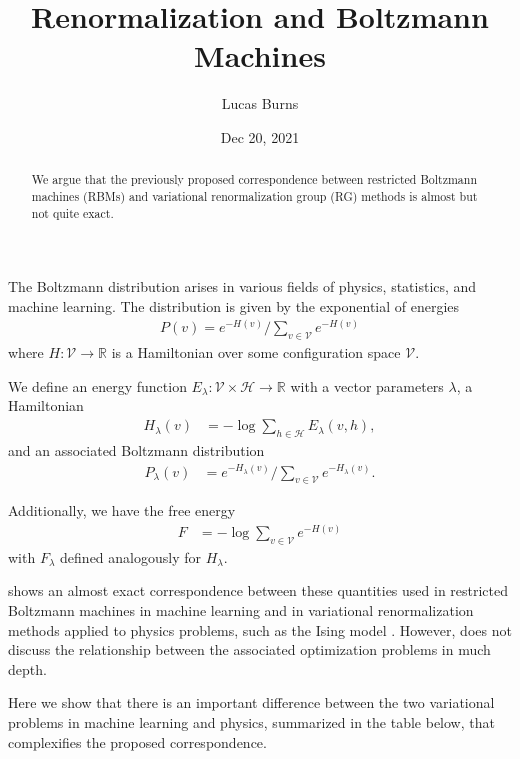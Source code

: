 \documentclass{article}
\title{Renormalization and Boltzmann Machines}
\author{Lucas Burns}
\date{Dec 20, 2021}
\theoremstyle{remark}
\theoremstyle{definition}
\begin{document}
\maketitle

\begin{abstract}
    We argue that the previously proposed correspondence between restricted Boltzmann machines (RBMs) and variational renormalization group (RG) methods \cite{mehta_exact_2014} is almost but not quite exact.
\end{abstract}

The Boltzmann distribution arises in various fields of physics, statistics, and machine learning. The distribution is given by the exponential of energies
\begin{align}
    P(v) = e^{-H(v)}/\sum_{v \in \mathcal V} e^{-H(v)}
\end{align}
where $H : \mathcal V \to \mathbb R$ is a Hamiltonian over some configuration space $\mathcal V$.

We define an energy function $E_\lambda : \mathcal V \times \mathcal H \to \mathbb R$ with a vector parameters $\lambda$, a Hamiltonian
\begin{align}
    H_\lambda(v) &= - \log \sum_{h \in \mathcal H} E_\lambda(v,h),
\end{align}
and an associated Boltzmann distribution
\begin{align}
    P_\lambda(v) &= e^{-H_\lambda(v)}/\sum_{v \in \mathcal V} e^{-H_\lambda(v)}.
\end{align}

Additionally, we have the free energy
\begin{align}
    F &= -\log \sum_{v \in \mathcal V} e^{-H(v)}
\end{align}
with $F_\lambda$ defined analogously for $H_\lambda$.

\cite{mehta_exact_2014} shows an almost exact correspondence between these quantities used in restricted Boltzmann machines in machine learning and in variational renormalization methods applied to physics problems, such as the Ising model \cite{wilson_renormalization_1974, kadanoff_statistical_2000}. However, \cite{mehta_exact_2014} does not discuss the relationship between the associated optimization problems in much depth. 

Here we show that there is an important difference between the two variational problems in machine learning and physics, summarized in the table below, that complexifies the proposed correspondence.
\end{document}
